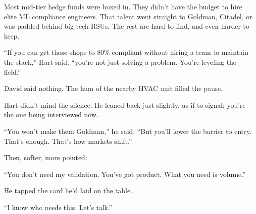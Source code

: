 Most mid-tier hedge funds were boxed in. They didn’t have the budget to hire elite ML compliance engineers. 
That talent went straight to Goldman, Citadel, or was padded behind big-tech RSUs. 
The rest are hard to find, and even harder to keep.

``If you can get those shops to 80\% compliant without hiring a team to maintain the stack,'' Hart said, ``you’re not 
just solving a problem. You’re leveling the field.''

David said nothing. The hum of the nearby HVAC unit filled the pause.

Hart didn’t mind the silence. He leaned back just slightly, as if to signal: you’re the one being interviewed now.

``You won’t make them Goldman,'' he said. ``But you’ll lower the barrier to entry. That’s enough. That’s how markets shift.''

Then, softer, more pointed:

``You don’t need my validation. You’ve got product. What you need is volume.''

He tapped the card he’d laid on the table.

``I know who needs this. Let’s talk.''

\medskip

